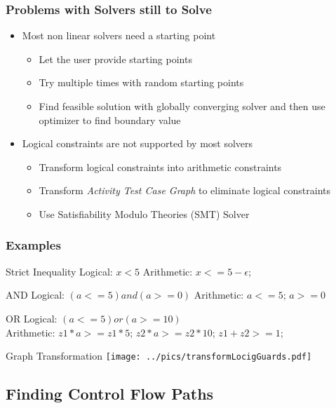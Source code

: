 \documentclass{beamer}
\begin{document}
\begin{frame}
\frametitle{Problems with Solvers still to Solve}
\begin{itemize}
\item Most non linear solvers need a starting point
\begin{itemize}
\item Let the user provide starting points
\item Try multiple times with random starting points
\item Find feasible solution with globally converging solver and then use optimizer to find boundary value
\end{itemize}
\item Logical constraints are not supported by most solvers
\begin{itemize}
\item Transform logical constraints into arithmetic constraints
\item Transform \emph{Activity Test Case Graph} to eliminate logical constraints
\item Use Satisfiability Modulo Theories (SMT) Solver
\end{itemize}
\end{itemize}
\end{frame}

\begin{frame}
\frametitle{Examples}
\begin{block}{Strict Inequality}
Logical: $x<5$ \hspace{1cm} Arithmetic: $x<=5-\epsilon$;
\end{block}
\begin{block}{AND}
Logical: $(a<=5) and (a>=0)$ \hspace{1cm} Arithmetic: $a<=5$; $a>=0$
\end{block}
\begin{block}{OR}
Logical: $(a<=5) or (a>=10)$ \\Arithmetic: $z1*a>=z1*5$; $ z2*a>=z2*10$; $z1+z2>=1$;
\end{block}
\begin{block}{Graph Transformation}
\texttt{[image: ../pics/transformLocigGuards.pdf]}
\end{block}
\end{frame}

\subsection{Finding Control Flow Paths}
\end{document}

